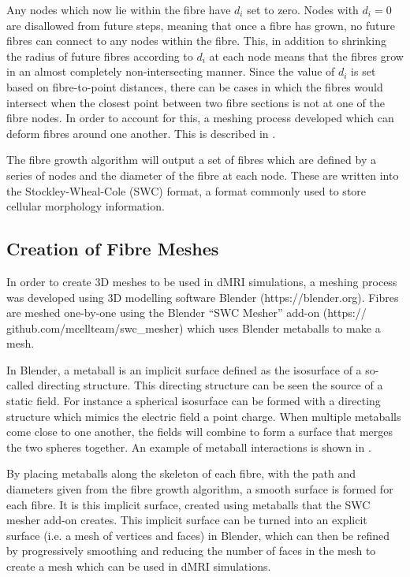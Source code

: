 Any nodes which now lie within the fibre have $d_i$ set to zero. 
Nodes with $d_i = 0$ are disallowed from future steps, meaning that once a fibre has grown, no future fibres can connect to any nodes within the fibre. 
This, in addition to shrinking the radius of future fibres according to $d_i$ at each node means that the fibres grow in an almost completely  non-intersecting manner.
Since the value of $d_i$ is set based on fibre-to-point distances, there can be cases in which the fibres would intersect when the closest point between two fibre sections is not at one of the fibre nodes.
In order to account for this, a meshing process developed which can deform fibres around one another. This is described in .


The fibre growth algorithm will output a set of fibres which are defined by a series of nodes and the diameter of the fibre at each node.
These are written into the Stockley-Wheal-Cole (SWC) format\cite{Stockley1993}, a format commonly used to store cellular morphology information.   
\vspace{-1em}
\subsection{Creation of Fibre Meshes}
\label{sec:creation_of_fibre_meshses}
In order to create 3D meshes to be used in dMRI simulations, a meshing process was developed using 3D modelling software Blender (https://blender.org).
Fibres are meshed one-by-one using the Blender “SWC Mesher” add-on  (https://\\github.com/mcellteam/swc\_mesher) which uses Blender metaballs to make a mesh.

In Blender, a metaball is an implicit surface defined as the isosurface of a so-called directing structure. 
This directing structure can be seen the source of a static field. For instance a spherical isosurface can be formed with a directing structure which mimics the electric field a point charge.
When multiple metaballs come close to one another, the fields will combine to form a surface that merges the two spheres together.
An example of metaball interactions is shown in .

By placing metaballs along the skeleton of each fibre, with the path and diameters given from the fibre growth algorithm, a smooth surface is formed for each fibre.
It is this implicit surface, created using metaballs that the SWC mesher add-on creates. 
This implicit surface can be turned into an explicit surface (i.e. a mesh of vertices and faces) in Blender, which can then be refined by progressively smoothing and reducing the number of faces in the mesh to create a mesh which can be used in dMRI simulations. 

